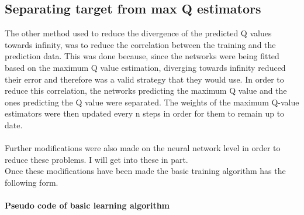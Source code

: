 \subsection{Separating target from max Q estimators}
The other method used to reduce the divergence of the predicted Q values towards infinity, was to reduce the correlation between the training and the prediction data. This was done because, since the networks were being fitted based on the maximum Q value estimation, diverging towards infinity reduced their error and therefore was a valid strategy that they would use. In order to reduce this correlation, the networks predicting the maximum Q value and the ones predicting the Q value were separated. The weights of the maximum Q-value estimators were then updated every n steps in order for them to remain up to date.\\
\mbox{}\\
Further modifications were also made on the neural network level in order to reduce these problems. I will get into these in part.\\
Once these modifications have been made the basic training algorithm has the following form.
\paragraph{Pseudo code of basic learning algorithm}

